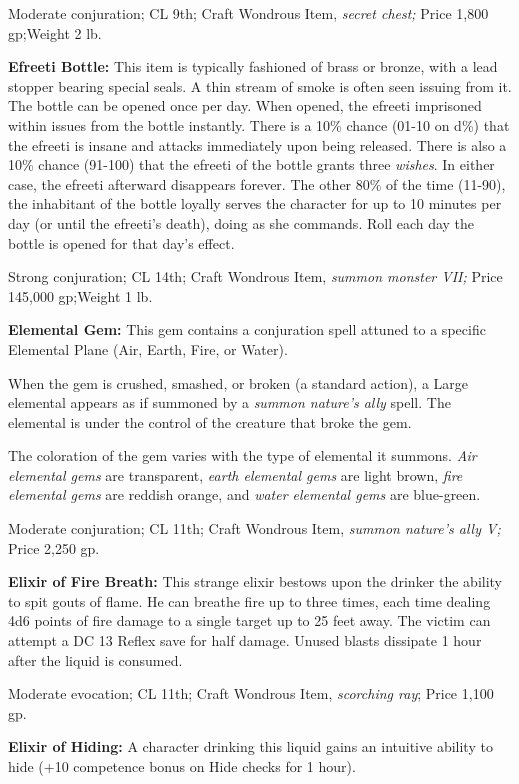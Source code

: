 Moderate conjuration; CL 9th; Craft Wondrous Item, \textit{secret chest; }Price 
1,800 gp;Weight 2 lb.

\textbf{Efreeti Bottle: }This item is typically fashioned of brass or bronze, with 
a lead stopper bearing special seals. A thin stream of smoke is often seen issuing 
from it. The bottle can be opened once per day. When opened, the efreeti imprisoned 
within issues from the bottle instantly. There is a 10\% chance (01-10 on d\%) 
that the efreeti is insane and attacks immediately upon being released. There is 
also a 10\% chance (91-100) that the efreeti of the bottle grants three \textit{wishes}. 
In either case, the efreeti afterward disappears forever. The other 80\% of the 
time (11-90), the inhabitant of the bottle loyally serves the character for up 
to 10 minutes per day (or until the efreeti's death), doing as she commands. Roll 
each day the bottle is opened for that day's effect.

Strong conjuration; CL 14th; Craft Wondrous Item, \textit{summon monster VII; }Price 
145,000 gp;Weight 1 lb.

\textbf{Elemental Gem:} This gem contains a conjuration spell attuned to a specific 
Elemental Plane (Air, Earth, Fire, or Water).

When the gem is crushed, smashed, or broken (a standard action), a Large elemental 
appears as if summoned by a \textit{summon nature's ally }spell. The elemental 
is under the control of the creature that broke the gem.

The coloration of the gem varies with the type of elemental it summons. \textit{Air 
elemental gems }are transparent, \textit{earth elemental gems }are light brown, 
\textit{fire elemental gems }are reddish orange, and \textit{water elemental gems 
}are blue-green.

Moderate conjuration; CL 11th; Craft Wondrous Item, \textit{summon nature's ally 
V; }Price 2,250 gp.

\textbf{Elixir of Fire Breath: }This strange elixir bestows upon the drinker the 
ability to spit gouts of flame. He can breathe fire up to three times, each time 
dealing 4d6 points of fire damage to a single target up to 25 feet away. The victim 
can attempt a DC 13 Reflex save for half damage. Unused blasts dissipate 1 hour 
after the liquid is consumed.

Moderate evocation; CL 11th; Craft Wondrous Item, \textit{scorching ray}; Price 
1,100 gp.

\textbf{Elixir of Hiding:} A character drinking this liquid gains an intuitive 
ability to hide (+10 competence bonus on Hide checks for 1 hour).

